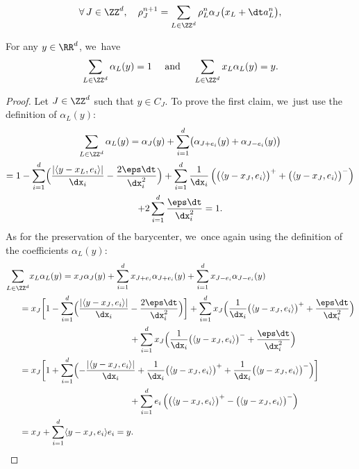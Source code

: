 \begin{equation*}%
\forall\, J \in \ZZ^d, \quad
\rho^{n+1}_J = \sum_{L\in\ZZ^d} \rho^n_L \alpha_{J}\bigl(x_L+\dt a^n_L\bigr),
\end{equation*}
\begin{lemma}\label{lemma:alpha}
For any $y \in \RR^d$, we~have
\[
\sum_{L\in \ZZ^d} \alpha_{L}(y) = 1 \quad \mbox{ and } \quad \sum_{L\in \ZZ^d} x_L \alpha_{L}(y) = y.
\]
\end{lemma}
\begin{proof}
Let $J\in \ZZ^d$ such that $y\in C_J$. To prove the first claim, we~just use the definition of $\alpha_{L}(y)$:
\begin{multline*}
\sum_{L\in \ZZ^d} \alpha_{L}(y) = \alpha_{J}(y) + \sum_{i=1}^d \bigl(\alpha_{J+e_i}(y)+\alpha_{J-e_i}(y)\bigr)
\\
= 1 - \sum_{i=1}^d \Bigl(\frac{|\langle y-{x_L},e_i\rangle|}{\dx_i} - \frac{2\eps\dt}{\dx_i^2}\Bigr)
+ \sum_{i=1}^d \frac{1}{\dx_i} \left(\bigl(\langle y-x_{J},e_i\rangle \bigr)^+ + \bigl(\langle y-x_{J},e_i\rangle \bigr)^-\right) \\
+ 2 \sum_{i=1}^d \frac{\eps\dt}{\dx_i^2} = 1.
\end{multline*}
As for the preservation of the barycenter, we~once again using the definition of the coefficients $\alpha_{L}(y)$:
\begin{align*}
\sum_{L\in \ZZ^d}& x_L \alpha_{L}(y) = x_J \alpha_J(y) + \sum_{i=1}^d x_{J+e_i} \alpha_{J+e_i}(y)+ \sum_{i=1}^d x_{J-e_i} \alpha_{J-e_i}(y)
\\
&\hspace*{-4mm}= x_J \biggl[1-\sum_{i=1}^d \Bigl(\frac{|\langle y-{x_J},e_i\rangle|}{\dx_i} - \frac{2\eps\dt}{\dx_i^2}\Bigr)\biggr] + \sum_{i=1}^d x_{J} \Bigl(\frac{1}{\dx_i}\bigl(\langle y-x_{J},e_i\rangle\bigr)^+ + \frac{\eps\dt}{\dx_i^2}\Bigr) \\
&\hspace*{4cm}+ \sum_{i=1}^d x_{J} \Bigl(\frac{1}{\dx_i}\bigl(\langle y-x_{J},e_i\rangle\bigr)^- + \frac{\eps\dt}{\dx_i^2} \Bigr) \\
&\hspace*{-4mm}= x_J \biggl[1+\sum_{i=1}^d \Bigl(-\frac{|\langle y-{x_J},e_i\rangle|}{\dx_i} + \frac{1}{\dx_i}\bigl(\langle y-x_{J},e_i\rangle\bigr)^+ + \frac{1}{\dx_i}\bigl(\langle y-x_{J},e_i\rangle\bigr)^- \Bigr)\biggr] \\
&\hspace*{4cm}+ \sum_{i=1}^d e_i \left(\bigl(\langle y-x_J, e_i\rangle \bigr)^+ - \bigl(\langle y-x_J, e_i\rangle \bigr)^- \right) \\
&\hspace*{-4mm}= x_J + \sum_{i=1}^d \langle y-x_J, e_i\rangle e_i = y.\qedhere
\end{align*}
\end{proof}

